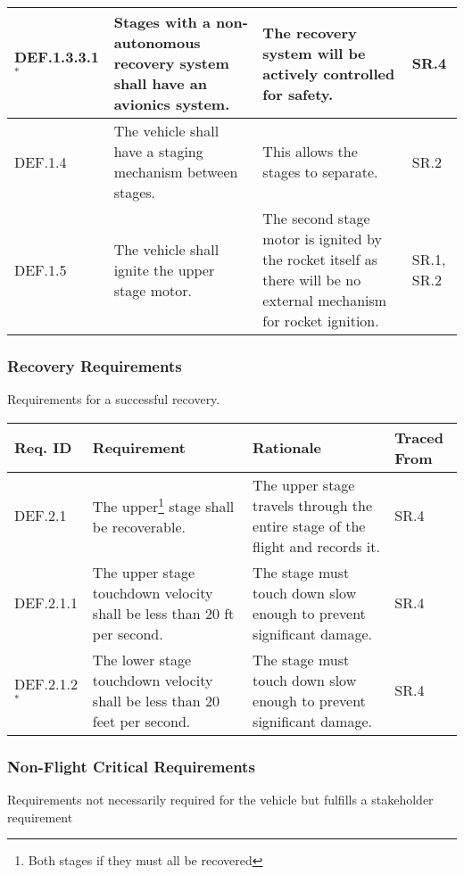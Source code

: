\begin{table}[htbp]
\begin{tabulary}{\textwidth}{@{}LLLL@{}}
        DEF.1.3.3.1\(^*\) & Stages with a non-autonomous recovery system shall have an avionics system. & The recovery system will be actively controlled for safety. & SR.4 \\
    \midrule
        DEF.1.4 & The vehicle shall have a staging mechanism between stages. & This allows the stages to separate. & SR.2 \\
    \midrule
        DEF.1.5 & The vehicle shall ignite the upper stage motor. & The second stage motor is ignited by the rocket itself as there will be no external mechanism for rocket ignition. & SR.1, SR.2 \\
    \bottomrule
    \end{tabulary}

    \label{table:func-1}
\end{table}


\subsubsection{Recovery Requirements}
Requirements for a successful recovery.

\begin{table}[htbp] %
    \centering
    \footnotesize 
    \setlength{\tymin}{40pt}
    \let\raggedright\RaggedRight
    
    \begin{tabulary}{\textwidth}{@{}LLLL@{}}
    \toprule
        \textbf{Req. ID} & \textbf{Requirement} & \textbf{Rationale} & \textbf{Traced From} \\
    \midrule
        DEF.2.1 & The upper\footnote{Both stages if they must all be recovered} stage shall be recoverable. & The upper stage travels through the entire stage of the flight and records it. & SR.4 \\
        DEF.2.1.1 & The upper stage touchdown velocity shall be less than 20 ft per second. & The stage must touch down slow enough to prevent significant damage. & SR.4 \\ 
        DEF.2.1.2\(^*\) & The lower stage touchdown velocity shall be less than 20 feet per second. & The stage must touch down slow enough to prevent significant damage. & SR.4 \\
    \bottomrule
    \end{tabulary}

    \label{table:func-2}
\end{table}


\subsubsection{Non-Flight Critical Requirements}
Requirements not necessarily required for the vehicle but fulfills a stakeholder requirement	

